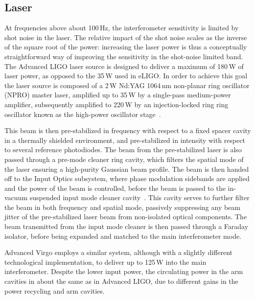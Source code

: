 	
\subsection{Laser}
At frequencies above about 100\,Hz, the interferometer sensitivity is limited by shot 
noise in the laser. The relative impact of the shot noise scales as the inverse of the 
square root of the power: increasing the laser power is thus a conceptually 
straightforward way of improving the sensitivity in the shot-noise limited band. 
The Advanced LIGO laser source is designed to deliver a maximum of 180\,W of laser power, as opposed to the 35\,W used in eLIGO.
In order to achieve this goal the laser source is composed of a 2\,W Nd:YAG 1064\,nm non-planar ring oscillator (NPRO) master laser, amplified up to 35\,W by a single-pass medium-power amplifier, subsequently amplified to 220\,W by an injection-locked ring ring oscillator known as the high-power oscillator stage~\cite{Kwee_2012}. 

This beam is then pre-stabilized in frequency with respect to a fixed spacer cavity in a thermally shielded environment, and pre-stabilized in intensity with respect to several reference photodiodes. 
The beam from the pre-stabilized laser is also passed through a pre-mode cleaner ring cavity, which filters the spatial mode of the laser ensuring a high-purity Gaussian beam profile. 
The beam is then handed off to the Input Optics subsystem, where phase modulation sidebands are applied and the power of the beam is controlled, before the beam is passed to the in-vacuum suspended input mode cleaner cavity~\cite{Mueller_2016}. 
This cavity serves to further filter the beam in both frequency and spatial mode, passively suppressing any beam jitter of the pre-stabilized laser beam from non-isolated optical components. 
The beam transmitted from the input mode cleaner is then passed through a Faraday isolator, before being expanded and matched to the 
main interferometer mode.

Advanced Virgo employs a similar system, although with a slightly different technological implementation, to deliver up to 125\,W into the main interferometer. Despite the lower input power, the circulating power in the arm cavities in about the same as in Advanced LIGO, due to different gains in the power recycling and arm cavities.

